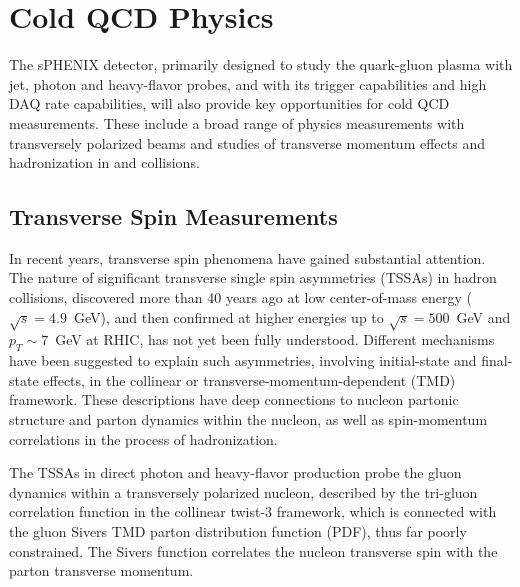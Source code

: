 \section{Cold QCD Physics}
\label{sec:ColdQCD}

The sPHENIX detector, primarily designed to study the quark-gluon plasma with jet, photon and
heavy-flavor probes, and with its trigger capabilities and high DAQ
rate capabilities, will also provide key opportunities for cold QCD
measurements. These include a broad range of physics measurements with
transversely polarized beams and studies of transverse momentum
effects and hadronization in \pp and \pA collisions.   


\subsection {Transverse Spin Measurements}

In recent years, transverse spin phenomena have gained substantial
attention. The nature of significant transverse single spin
asymmetries (TSSAs) in hadron collisions, discovered more than 40
years ago at low center-of-mass energy ($\sqrt{s}=4.9$~GeV), and then
confirmed at higher energies up to $\sqrt{s}=500$~GeV and $p_T \sim
7$~GeV at RHIC, has not yet been fully understood. Different
mechanisms have been suggested to explain such asymmetries, involving
initial-state and final-state effects, in the collinear or
transverse-momentum-dependent (TMD) framework. These descriptions have
deep connections to nucleon partonic structure and parton dynamics
within the nucleon, as well as spin-momentum correlations in the
process of hadronization. 

The TSSAs in direct photon and heavy-flavor production probe the gluon
dynamics within a transversely polarized nucleon, described by the
tri-gluon correlation function in the collinear twist-3 framework,
which is connected with the gluon Sivers TMD parton distribution
function (PDF), thus far poorly constrained. The Sivers function
correlates the nucleon transverse spin with the parton transverse
momentum. 

